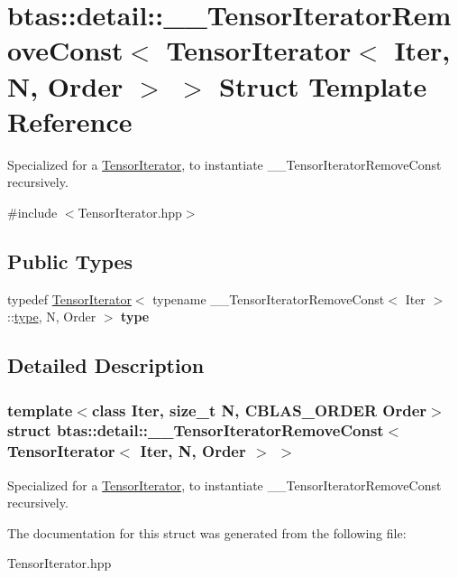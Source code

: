 \hypertarget{structbtas_1_1detail_1_1_____tensor_iterator_remove_const_3_01_tensor_iterator_3_01_iter_00_01_n_00_01_order_01_4_01_4}{
\section{btas::detail::\_\-\_\-TensorIteratorRemoveConst$<$ TensorIterator$<$ Iter, N, Order $>$ $>$ Struct Template Reference}
\label{structbtas_1_1detail_1_1_____tensor_iterator_remove_const_3_01_tensor_iterator_3_01_iter_00_01_n_00_01_order_01_4_01_4}
}


Specialized for a \hyperlink{classbtas_1_1_tensor_iterator}{TensorIterator}, to instantiate \_\-\_\-TensorIteratorRemoveConst recursively.  


{\ttfamily \#include $<$TensorIterator.hpp$>$}\subsection*{Public Types}
\begin{DoxyCompactItemize}
\item 
\hypertarget{structbtas_1_1detail_1_1_____tensor_iterator_remove_const_3_01_tensor_iterator_3_01_iter_00_01_n_00_01_order_01_4_01_4_a6dddac6b3fb1b59eab709233eeb95a50}{
typedef \hyperlink{classbtas_1_1_tensor_iterator}{TensorIterator}$<$ typename \_\-\_\-TensorIteratorRemoveConst$<$ Iter $>$::\hyperlink{classbtas_1_1_tensor_iterator}{type}, N, Order $>$ {\bfseries type}}
\label{structbtas_1_1detail_1_1_____tensor_iterator_remove_const_3_01_tensor_iterator_3_01_iter_00_01_n_00_01_order_01_4_01_4_a6dddac6b3fb1b59eab709233eeb95a50}

\end{DoxyCompactItemize}


\subsection{Detailed Description}
\subsubsection*{template$<$class Iter, size\_\-t N, CBLAS\_\-ORDER Order$>$ struct btas::detail::\_\-\_\-TensorIteratorRemoveConst$<$ TensorIterator$<$ Iter, N, Order $>$ $>$}

Specialized for a \hyperlink{classbtas_1_1_tensor_iterator}{TensorIterator}, to instantiate \_\-\_\-TensorIteratorRemoveConst recursively. 

The documentation for this struct was generated from the following file:\begin{DoxyCompactItemize}
\item 
TensorIterator.hpp\end{DoxyCompactItemize}
